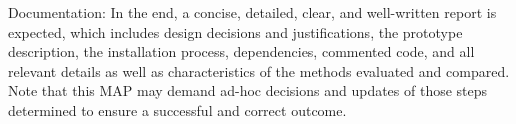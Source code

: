 Documentation: In the end, a concise, detailed, clear, and well-written report is expected, which includes design decisions and justifications, the prototype description, the installation process, dependencies, commented code, and all relevant details as well as characteristics of the methods evaluated and compared. Note that this MAP may demand ad-hoc decisions and updates of those steps determined to ensure a successful and correct outcome.
